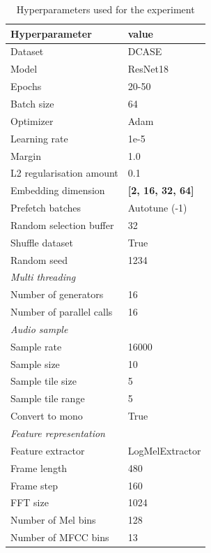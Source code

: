 \documentclass[twocolumn]{article}
\begin{document}
\begin{table}[H]
    \centering
    \caption{Hyperparameters used for the experiment}
	\label{tab:Hyperparameters}
    \begin{tabular}{l|l}
        \toprule
        \textbf{Hyperparameter} & \textbf{value} \\ 
        \midrule[1pt]
        Dataset & DCASE \\
        \hline
        Model & ResNet18 \\ 
        \hline
        Epochs & 20-50 \\ 
        \hline
        Batch size & 64 \\ 
        \hline
        Optimizer & Adam \\ 
        \hline
        Learning rate & 1e-5 \\
        \hline
        Margin & 1.0 \\
        \hline
        L2 regularisation amount & 0.1 \\
        \hline
        Embedding dimension & \textbf{[2, 16, 32, 64]} \\
        \hline
        Prefetch batches & Autotune (-1) \\ 
        \hline
        Random selection buffer & 32 \\ 
        \hline
        Shuffle dataset & True \\
        \hline
        Random seed & 1234 \\
        \midrule[1pt]
        \multicolumn{2}{l}{\textit{Multi threading}} \\
        \midrule[1pt]
        Number of generators & 16 \\ 
        \hline
        Number of parallel calls & 16 \\
        \midrule[1pt]
        \multicolumn{2}{l}{\textit{Audio sample}} \\
        \midrule[1pt]
        Sample rate & 16000 \\ 
        \hline
        Sample size & 10 \\
        \hline
        Sample tile size & 5 \\
        \hline
        Sample tile range & 5 \\
        \hline
        Convert to mono & True \\
        \midrule[1pt]
        \multicolumn{2}{l}{\textit{Feature representation}} \\
        \midrule[1pt]
        Feature extractor & LogMelExtractor \\ 
        \hline
        Frame length & 480 \\
        \hline
        Frame step & 160 \\
        \hline
        FFT size & 1024 \\
        \hline
        Number of Mel bins & 128 \\
        \hline
        Number of MFCC bins & 13 \\
        \bottomrule
    \end{tabular}
\end{table}
\end{document}
